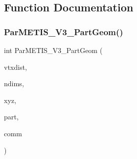 \subsection{Function Documentation}
\mbox{\label{a00356_a6ba7172d25cc2a5601ec5a64014ec7a2}} 
\subsubsection{\texorpdfstring{Par\+M\+E\+T\+I\+S\+\_\+\+V3\+\_\+\+Part\+Geom()}{ParMETIS\_V3\_PartGeom()}}
{\footnotesize\ttfamily int Par\+M\+E\+T\+I\+S\+\_\+\+V3\+\_\+\+Part\+Geom (\begin{DoxyParamCaption}\item[{\hyperlink{a00876_aaa5262be3e700770163401acb0150f52}{idx\+\_\+t} $\ast$}]{vtxdist,  }\item[{\hyperlink{a00876_aaa5262be3e700770163401acb0150f52}{idx\+\_\+t} $\ast$}]{ndims,  }\item[{\hyperlink{a00876_a1924a4f6907cc3833213aba1f07fcbe9}{real\+\_\+t} $\ast$}]{xyz,  }\item[{\hyperlink{a00876_aaa5262be3e700770163401acb0150f52}{idx\+\_\+t} $\ast$}]{part,  }\item[{M\+P\+I\+\_\+\+Comm $\ast$}]{comm }\end{DoxyParamCaption})}


